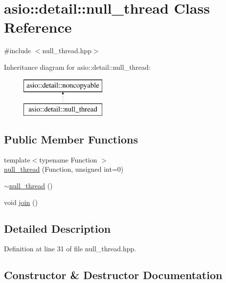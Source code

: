 \hypertarget{classasio_1_1detail_1_1null__thread}{}\section{asio\+:\+:detail\+:\+:null\+\_\+thread Class Reference}
\label{classasio_1_1detail_1_1null__thread}


{\ttfamily \#include $<$null\+\_\+thread.\+hpp$>$}

Inheritance diagram for asio\+:\+:detail\+:\+:null\+\_\+thread\+:\begin{figure}[H]
\begin{center}
\leavevmode
\includegraphics[height=2.000000cm]{classasio_1_1detail_1_1null__thread}
\end{center}
\end{figure}
\subsection*{Public Member Functions}
\begin{DoxyCompactItemize}
\item 
{\footnotesize template$<$typename Function $>$ }\\\hyperlink{classasio_1_1detail_1_1null__thread_af17a545fb3bfa54bb1ce5e44fac5d8cb}{null\+\_\+thread} (Function, unsigned int=0)
\item 
\hyperlink{classasio_1_1detail_1_1null__thread_ae23a0a6b8b148c1e4c241270de472409}{$\sim$null\+\_\+thread} ()
\item 
void \hyperlink{classasio_1_1detail_1_1null__thread_ab6aa75c67e7b1fea5783591fda3286f5}{join} ()
\end{DoxyCompactItemize}


\subsection{Detailed Description}


Definition at line 31 of file null\+\_\+thread.\+hpp.



\subsection{Constructor \& Destructor Documentation}
\hypertarget{classasio_1_1detail_1_1null__thread_af17a545fb3bfa54bb1ce5e44fac5d8cb}{}
